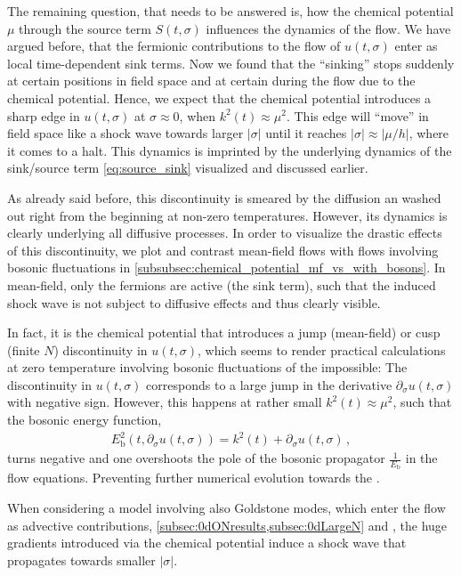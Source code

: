 The remaining question, that needs to be answered is, how the chemical potential $\mu$ \dash{} through the source term $S(t,\sigma)$ \dash{} influences the dynamics of the \frg{} flow.
We have argued before, that the fermionic contributions to the \frg{} flow of $u ( t, \sigma )$ enter as local time-dependent sink terms.
Now we found that the ``sinking'' stops suddenly at certain positions in field space and at certain \rgtimes{} during the \frg{} flow due to the chemical potential.
Hence, we expect that the chemical potential introduces a sharp edge in $u ( t, \sigma )$ at $\sigma \approx 0$, when $k^2 ( t ) \approx \mu^2$.
This edge will ``move'' in field space like a shock wave towards larger $| \sigma |$ until it reaches $| \sigma | \approx | \mu/h |$, where it comes to a halt.
This dynamics is imprinted by the underlying dynamics of the sink/source term \eqref{eq:source_sink} visualized and discussed earlier.
	
As already said before, this discontinuity is smeared by the diffusion an washed out right from the beginning at non-zero temperatures.
However, its dynamics is clearly underlying all diffusive processes.
In order to visualize the drastic effects of this discontinuity, we plot and contrast mean-field \frg{} flows with \frg{} flows involving bosonic fluctuations in \cref{subsubsec:chemical_potential_mf_vs_with_bosons}.
In mean-field, only the fermions are active (the sink term), such that the induced shock wave is not subject to diffusive effects and thus clearly visible.\bigskip
	
In fact, it is the chemical potential that introduces a jump (mean-field) or cusp (finite $N$) discontinuity in $u ( t, \sigma )$, which seems to render practical calculations at zero temperature involving bosonic fluctuations of the \sigmaMode{} impossible:
The discontinuity in $u ( t, \sigma )$ corresponds to a large jump in the derivative $\partial_\sigma u ( t, \sigma )$ with negative sign.
However, this happens at rather small $k^2 ( t ) \approx \mu^2$, such that the bosonic energy function,
\begin{align}
	E_\mathrm{b}^2 ( t, \partial_\sigma u ( t, \sigma ) ) = k^2 ( t) + \partial_\sigma u ( t, \sigma ) \, ,
\end{align}
turns negative and one overshoots the pole of the bosonic propagator $\tfrac{1}{E_\mathrm{b}}$ in the \frg{} flow equations.
Preventing further numerical evolution towards the \ir{}.
	
When considering a model involving also Goldstone modes{}, which enter the \frg{} flow as advective contributions, \cf{} \cref{subsec:0dONresults,subsec:0dLargeN} and , the huge gradients introduced via the chemical potential induce a shock wave that propagates towards smaller $|\sigma|$.
	
